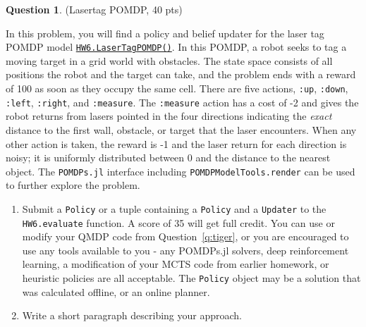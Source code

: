 \documentclass{article}
\theoremstyle{definition}
\newtheorem{question}[thm]{Question}
\begin{document}
\begin{question}
    (Lasertag POMDP, 40 pts)
    
    In this problem, you will find a policy and belief updater for the laser tag POMDP model \href{https://github.com/zsunberg/DMUStudent.jl/blob/e7301fcc46738b3b2aa517ab31aeb61624426479/src/HW6.jl#L31-L202}{\texttt{HW6.LaserTagPOMDP()}}.  In this POMDP, a robot seeks to tag a moving target in a grid world with obstacles. The state space consists of all positions the robot and the target can take, and the problem ends with a reward of 100 as soon as they occupy the same cell. There are five actions, \texttt{:up}, \texttt{:down}, \texttt{:left}, \texttt{:right}, and \texttt{:measure}. The \texttt{:measure} action has a cost of -2 and gives the robot returns from lasers pointed in the four directions indicating the \emph{exact} distance to the first wall, obstacle, or target that the laser encounters. When any other action is taken, the reward is -1 and the laser return for each direction is noisy; it is uniformly distributed between 0 and the distance to the nearest object. The \texttt{POMDPs.jl} interface including \texttt{POMDPModelTools.render} can be used to further explore the problem.

    \begin{enumerate}[label=\alph*)]
        \item Submit a \texttt{Policy} or a tuple containing a \texttt{Policy} and a \texttt{Updater} to the \texttt{HW6.evaluate} function. A score of 35 will get full credit. You can use or modify your QMDP code from Question~\ref{q:tiger}, or you are encouraged to use any tools available to you - any POMDPs.jl solvers, deep reinforcement learning, a modification of your MCTS code from earlier homework, or heuristic policies are all acceptable. The \texttt{Policy} object may be a solution that was calculated offline, or an online planner.
        \item Write a short paragraph describing your approach.
    \end{enumerate}
\end{question}
\end{document}
